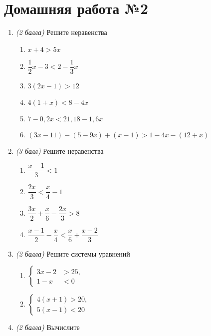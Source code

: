 \documentclass[12pt, a4paper]{article}
\begin{document}
	
	\section*{Домашняя работа №2}
	\begin{enumerate}
		\item \textit{(2 балла)} Решите неравенства
		\begin{enumerate}[label=\asbuk*)]
			\item $x+4>5x$
			\item $\dfrac{1}{2}x-3<2-\dfrac{1}{3}x$
			\item $3(2x-1)>12$
			\item $4(1+x)<8-4x$
			\item $7-0,2x<21,18-1,6x$
			\item $(3x-11)-(5-9x)+(x-1)>1-4x-(12+x)$
		\end{enumerate}
		\item \textit{(3 балл)} Решите неравенства
		\begin{multicols}{2}
			\begin{enumerate}[label=\asbuk*)]
				\item $\dfrac{x-1}{3}<1$
				\item $\dfrac{2x}{3}<\dfrac{x}{4}-1$
				\item $\dfrac{3x}{2}+\dfrac{x}{6}-\dfrac{2x}{3}>8$
				\item $\dfrac{x-1}{2}-\dfrac{x}{4}<\dfrac{x}{6}+\dfrac{x-2}{3}$
			\end{enumerate}
		\end{multicols}
		\item \textit{(2 балла)} Решите системы уравнений
			\begin{multicols}{2}
				\begin{enumerate}[label=\asbuk*)]
			\item  $\left\{
			\begin{aligned}
				3x-2&>25,\\
				1-x&<0
			\end{aligned}
			\right.$
			\item  $\left\{
			\begin{aligned}
				4(x+1)>20,\\
				5(x-1)<20
			\end{aligned}
			\right.$
			\end{enumerate}
		\end{multicols}
			\item \textit{(2 балла)} Вычислите

\end{enumerate}
\end{document}
